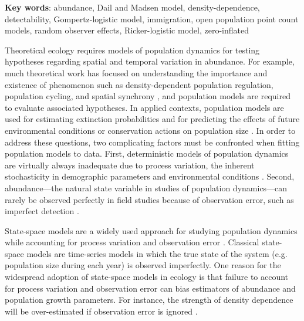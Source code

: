 \documentclass[12pt]{article}
\begin{document}
\vspace{0.5cm}

\textbf{Key words}: abundance, Dail and Madsen model, density-dependence,
detectability, Gompertz-logistic model, immigration, open population point 
count models, random observer effects, Ricker-logistic model, zero-inflated

\newpage

Theoretical ecology requires models of population dynamics for testing
hypotheses regarding spatial and temporal variation in
abundance. For example, much theoretical work has focused on
understanding the importance and existence of phenomenon such as
density-dependent population regulation, population cycling, and spatial synchrony
\citep{may:1975,royama:1977,turchin:1990,dennis_taper:1994,bjornstad_etal:1999},
and population models are required to evaluate associated hypotheses.
In applied contexts, population models are used for estimating extinction probabilities
\citep{schoener_spiller:1992,nadeem_lele:2011,hostetler_etal:2012} and for predicting the
effects of future environmental conditions or conservation actions on
population size \citep{jamieson_brooks:2004,hatfield_etal:2012}.
In order to address these questions, two complicating factors must
be confronted when fitting population models to data. 
First, deterministic models of population dynamics are virtually always inadequate due to process
variation, the inherent stochasticity in demographic parameters and environmental
conditions \citep{bjornstad_grenfell:2001,saether_engen:2002}.
Second, abundance---the natural state variable in studies
of population dynamics---can rarely be observed perfectly in field
studies because of observation error, such as imperfect
detection \citep{link_nichols:1994,kery_etal:2009}.

State-space models are a widely used approach for
studying population dynamics while accounting for process variation
and observation error \citep{devalpine_hastings:2002,
  buckland_etal:2004, dennis_etal:2006}. Classical state-space
models are time-series models in which the true state of the
system (e.g. population size during each year) is observed
imperfectly. One reason for the widespread adoption of
state-space models in ecology is that failure to account for process
variation and observation error can bias estimators of abundance and
population growth parameters. For instance, the strength of
density dependence will be over-estimated if observation error is
ignored \citep{link_nichols:1994,shenk_etal:1998}.
\end{document}
